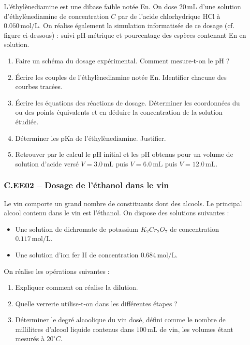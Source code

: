 L'éthylènediamine est une dibase faible notée En. On dose $20\, \text{mL}$ d'une solution d'éthylènediamine de concentration $C$ par de l'acide chlorhydrique HCl à $0.050\, \text{mol/L}$. On réalise également la simulation informatisée de ce dosage (cf. figure ci-dessous) : suivi pH-métrique et pourcentage des espèces contenant En en solution.

\begin{center}
\end{center}

\begin{enumerate}
    \item Faire un schéma du dosage expérimental. Comment mesure-t-on le pH ?
    \item Écrire les couples de l'éthylènediamine notée En. Identifier chacune des courbes tracées.
    \item Écrire les équations des réactions de dosage. Déterminer les coordonnées du ou des points équivalents et en déduire la concentration de la solution étudiée.
    \item Déterminer les pKa de l'éthylènediamine. Justifier.
    \item Retrouver par le calcul le pH initial et les pH obtenus pour un volume de solution d'acide versé $V = 3.0\, \text{mL}$ puis $V = 6.0\, \text{mL}$ puis $V = 12.0\, \text{mL}$.
\end{enumerate}

\newpage
\subsubsection*{C.EE02 -- Dosage de l'éthanol dans le vin  \corrige}

Le vin comporte un grand nombre de constituants dont des alcools. Le principal alcool contenu dans le vin est l'éthanol. On dispose des solutions suivantes :

\begin{itemize}
    \item Une solution de dichromate de potassium $K_2Cr_2O_7$ de concentration $0.117\, \text{mol/L}$.
    \item Une solution d'ion fer II de concentration $0.684\, \text{mol/L}$.
\end{itemize}

On réalise les opérations suivantes :

\begin{enumerate}
    \item Expliquer comment on réalise la dilution.
    \item Quelle verrerie utilise-t-on dans les différentes étapes ?
    \item Déterminer le degré alcoolique du vin dosé, défini comme le nombre de millilitres d'alcool liquide contenus dans $100\, \text{mL}$ de vin, les volumes étant mesurés à $20^\circ C$.
\end{enumerate}

